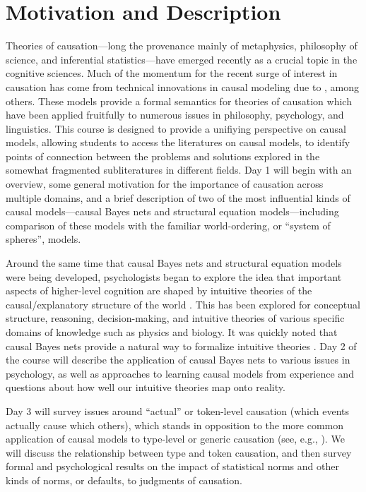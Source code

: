 \documentclass[english]{article}
\begin{document}
\section*{\large{Motivation and Description}}

Theories of causation---long the provenance mainly of metaphysics, philosophy of science, and inferential statistics---have emerged recently as a crucial topic in the cognitive sciences. Much of the momentum for the recent surge of interest in causation has come from technical innovations in causal modeling due to \citet{spirtes93,pearl00}, among others. These models provide a formal semantics for theories of causation which have been applied fruitfully to numerous issues in philosophy, psychology, and linguistics. This course is designed to provide a unifiying perspective on causal models, allowing students to access the literatures on causal models, to identify points of connection between the problems and solutions explored in the somewhat fragmented subliteratures in different fields. Day 1 will begin with an overview, some general motivation for the importance of causation across multiple domains, and a brief description of two of the most influential kinds of causal models---causal Bayes nets and structural equation models---including comparison of these models with the familiar world-ordering, or ``system of spheres'', models.

Around the same time that causal Bayes nets and structural equation models were being developed, psychologists began to explore the idea that important aspects of higher-level cognition are shaped by intuitive theories of the causal/explanatory structure of the world \citep{keil89,gopnikmeltzoff97}. This has been explored for conceptual structure, reasoning, decision-making, and intuitive theories of various specific domains of knowledge such as physics and biology. It was quickly noted that causal Bayes nets provide a natural way to formalize intuitive theories \citep{glymour01,gopnik04,gopnikschultz07}. Day 2 of the course will describe the application of causal Bayes nets to various issues in psychology, as well as approaches to learning causal models from experience and questions about how well our intuitive theories map onto reality.

Day 3 will survey issues around ``actual'' or token-level causation (which events actually cause which others), which stands in opposition to the more common application of causal models to type-level or generic causation (see, e.g., \citealt{halpernpearl05a,halpernpearl05b}). We will discuss the relationship between type and token causation, and then survey formal and psychological results on the impact of statistical norms and other kinds of norms, or defaults, to judgments of causation.
\end{document}
